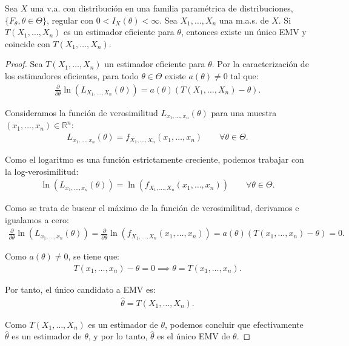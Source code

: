 \begin{teo}
    Sea $X$ una v.a. con distribución en una familia paramétrica de distribuciones, $\{F_\theta, \theta \in \Theta\}$, regular con $0 < I_X(\theta) < \infty$. Sea $X_1, \ldots, X_n$ una m.a.s. de $X$. Si $T(X_1, \ldots, X_n)$ es un estimador eficiente para $\theta$, entonces existe un único EMV y coincide con $T(X_1, \ldots, X_n)$.
    \begin{proof}
        Sea $T(X_1, \ldots, X_n)$ un estimador eficiente para $\theta$. Por la caracterización de los estimadores eficientes, para todo $\theta \in \Theta$ existe $a(\theta)\neq 0$ tal que:
        \begin{align*}
            \frac{\partial}{\partial \theta} \ln(L_{X_1, \ldots, X_n}(\theta)) = a(\theta)(T(X_1, \ldots, X_n) - \theta).
        \end{align*}

        Consideramos la función de verosimilitud $L_{x_1, \ldots, x_n}(\theta)$ para una muestra $(x_1, \ldots, x_n) \in \mathbb{R}^n$:
        \begin{align*}
            L_{x_1, \ldots, x_n}(\theta) = f_{X_1, \ldots, X_n}(x_1, \ldots, x_n) \qquad \forall \theta \in \Theta.
        \end{align*}

        Como el logaritmo es una función estrictamente creciente, podemos trabajar con la log-verosimilitud:
        \begin{align*}
            \ln(L_{x_1, \ldots, x_n}(\theta)) = \ln(f_{X_1, \ldots, X_n}(x_1, \ldots, x_n)) \qquad \forall \theta \in \Theta.
        \end{align*}

        Como se trata de buscar el máximo de la función de verosimilitud, derivamos e igualamos a cero:
        \begin{align*}
            \frac{\partial}{\partial \theta} \ln(L_{x_1, \ldots, x_n}(\theta)) = \frac{\partial}{\partial \theta} \ln(f_{X_1, \ldots, X_n}(x_1, \ldots, x_n)) = a(\theta)(T(x_1, \ldots, x_n) - \theta) = 0.
        \end{align*}

        Como $a(\theta)\neq 0$, se tiene que:
        \begin{align*}
            T(x_1, \ldots, x_n) - \theta = 0 \implies \theta = T(x_1, \ldots, x_n).
        \end{align*}

        Por tanto, el único candidato a EMV es:
        \begin{align*}
            \hat{\theta} = T(X_1, \ldots, X_n).
        \end{align*}

        Como $T(X_1, \ldots, X_n)$ es un estimador de $\theta$, podemos concluir que efectivamente $\hat{\theta}$ es un estimador de $\theta$, y por lo tanto, $\hat{\theta}$ es el único EMV de $\theta$.
    \end{proof}
\end{teo}

